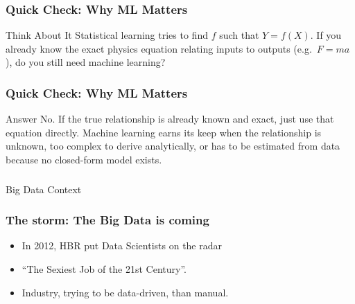 
\begin{frame}[fragile]\frametitle{Quick Check: Why ML Matters}
\begin{block}{Think About It}
Statistical learning tries to find $f$ such that $Y = f(X)$. If you already know the exact physics equation relating inputs to outputs (e.g.\ $F = ma$), do you still need machine learning?
\end{block}
\end{frame}

\begin{frame}[fragile]\frametitle{Quick Check: Why ML Matters}
\begin{block}{Answer}
No. If the true relationship is already known and exact, just use that equation directly. Machine learning earns its keep when the relationship is unknown, too complex to derive analytically, or has to be estimated from data because no closed-form model exists.
\end{block}
\end{frame}

\begin{frame}[fragile]\frametitle{}
\begin{center}
{\Large Big Data Context}
\end{center}
\end{frame}

\begin{frame}[fragile]\frametitle{The storm: The Big Data is coming}
\begin{itemize}
\item In 2012, HBR put Data Scientists on the radar
\item ``The Sexiest Job of the 21st Century''.
\item Industry, trying to be data-driven, than manual.
\end{itemize}
\end{frame}



